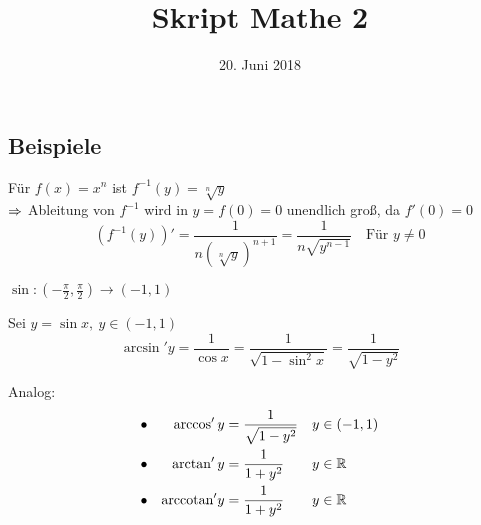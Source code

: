 \documentclass[10pt, a4paper, fleqn]{article}
\begin{document}
    \title{Skript Mathe 2}
    \date{20. Juni 2018}
    \maketitle
\fi

\subsection{Beispiele}
\begin{enumerate}[a)]
    \item Für $f(x) = x^n$ ist $f^{-1} (y) = \sqrt[n]{y}$ \\
    $\Rightarrow$ Ableitung von $f^{-1}$ wird in $y = f(0) = 0$ unendlich
    groß, da $f'(0) = 0$
    \[
        (f^{-1}(y))' = \frac{1}{n(\sqrt[n]{y})^{n+1}} = \frac{1}{n\sqrt{y^{n-1}}}
        \quad \text{Für $y \neq 0$}
    \]
    \begin{minipage}{0.6\textwidth}
        \item $\sin: (-\frac{\pi}{2}, \frac{\pi}{2}) \to (-1, 1)$
        
        Sei $y = \sin x, \ y \in (-1, 1)$
        \[
            \arcsin' y = \frac{1}{\cos x} = \frac{1}{\sqrt{1 - \sin^2 x}} =
            \frac{1}{\sqrt{1 - y^2}}
        \]
    \end{minipage}
    \begin{minipage}{0.4\textwidth}
    \end{minipage}
    Analog:
    \[\begin{aligned}
        &\bullet& \arccos' y &= \dfrac{1}{\sqrt{1-y^2}} &&y \in (-1, 1) \\
        &\bullet& \arctan' y &= \dfrac{1}{1 + y^2} &&y \in \mathbb{R} \\
        &\bullet& \text{arccotan}' y &= \dfrac{1}{1 + y^2} &&y \in \mathbb{R}
    \end{aligned}\]
    

\end{enumerate}
\end{document}
